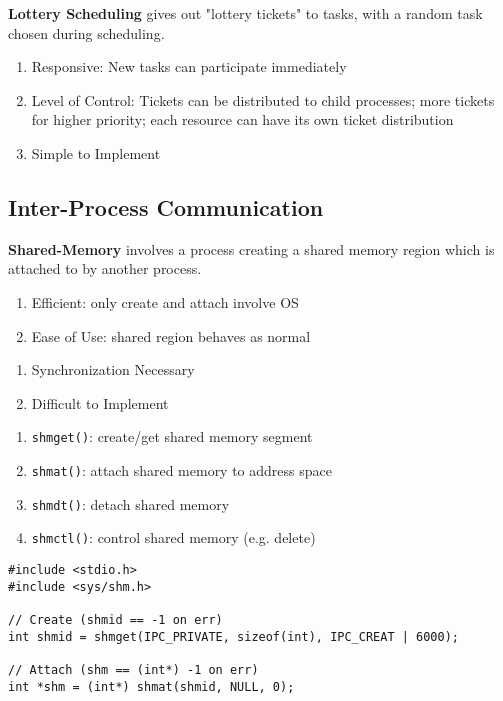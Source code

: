 \documentclass[12pt, a4paper]{article}
\begin{document}
\begin{multicols*}{3}
\textbf{Lottery Scheduling} gives out "lottery tickets" to tasks, with a random task chosen during scheduling.
\begin{enumerate}[$+$]
  \item Responsive: New tasks can participate immediately
  \item Level of Control: Tickets can be distributed to child processes; more tickets for higher priority; each resource can have its own ticket distribution
  \item Simple to Implement
\end{enumerate}
\vspace{-1em}
\colbreak
\subsection{Inter-Process Communication}

\textbf{Shared-Memory} involves a process creating a shared memory region which is attached to by another process.
\begin{enumerate}[$+$]
  \item Efficient: only create and attach involve OS
  \item Ease of Use: shared region behaves as normal
\end{enumerate}\vspace{-1pt}
\begin{enumerate}[$-$]
  \item Synchronization Necessary
  \item Difficult to Implement
\end{enumerate}\vspace{-1pt}
\begin{enumerate}[\roman*.]
  \item \lstinline|shmget()|: create/get shared memory segment
  \item \lstinline|shmat()|: attach shared memory to address space
  \item \lstinline|shmdt()|: detach shared memory
  \item \lstinline|shmctl()|: control shared memory (e.g. delete)
\end{enumerate}

\begin{lstlisting}
#include <stdio.h>
#include <sys/shm.h>

// Create (shmid == -1 on err)
int shmid = shmget(IPC_PRIVATE, sizeof(int), IPC_CREAT | 6000);

// Attach (shm == (int*) -1 on err)
int *shm = (int*) shmat(shmid, NULL, 0);


\end{lstlisting}
\end{multicols*}
\end{document}
